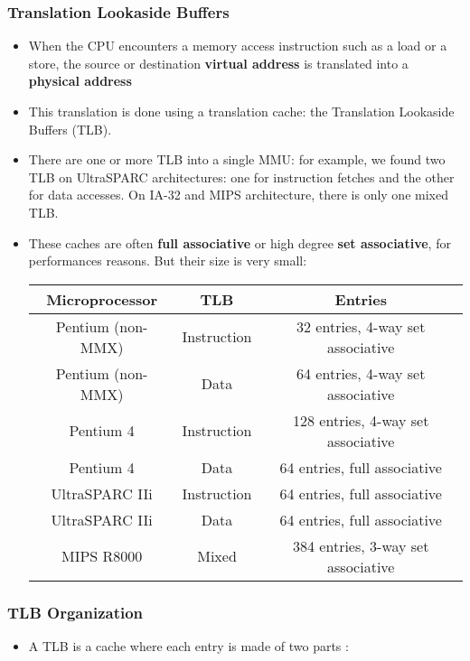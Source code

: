 
\begin{frame}
  \frametitle{Translation Lookaside Buffers}

  \begin{itemize}
    \item
    When the CPU encounters a memory access instruction such as
    a load or a store, the source or destination \textbf{virtual
    address} is translated into a \textbf{physical address}
    \item
    This translation is done using a translation cache: the
    Translation Lookaside Buffers (TLB).
    \item
    There are one or more TLB into a single MMU: for example, we
    found two TLB on UltraSPARC architectures: one for instruction
    fetches and the other for data accesses. On IA-32 and MIPS
    architecture, there is only one mixed TLB.
    \item
    These caches are often \textbf{full associative} or high degree
    \textbf{set associative}, for performances reasons. But their size
    is very small:
    \begin{tabular}{|c|c|c|}
    \hline
    Microprocessor & TLB & Entries \\
    \hline
    Pentium (non-MMX) & Instruction & 32 entries, 4-way set associative \\
    \hline
    Pentium (non-MMX) & Data & 64 entries, 4-way set associative \\
    \hline
    Pentium 4 & Instruction & 128 entries, 4-way set associative \\
    \hline
    Pentium 4 & Data & 64 entries, full associative \\
    \hline
    UltraSPARC IIi & Instruction & 64 entries, full associative \\
    \hline
    UltraSPARC IIi & Data & 64 entries, full associative \\
    \hline
    MIPS R8000 & Mixed & 384 entries, 3-way set associative \\
    \hline
    \end{tabular}
  \end{itemize}
\end{frame}


\begin{frame}
  \frametitle{TLB Organization}

    \begin{itemize}
      \item A TLB is a cache where each entry is made of two parts :

      \begin{center}
      \end{center}
    \end{itemize}
\end{frame}

